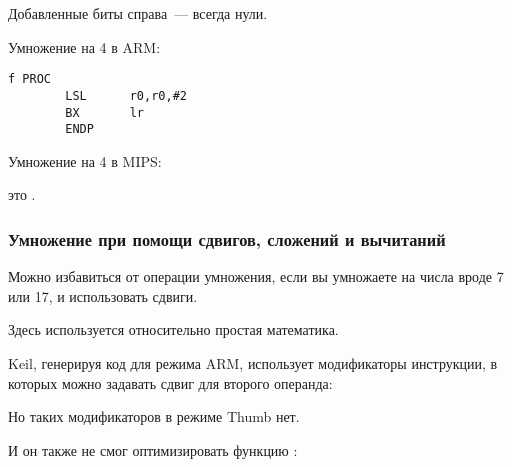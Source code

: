 Добавленные биты справа~--- всегда нули.

Умножение на 4 в ARM:

\begin{lstlisting}[caption=\NonOptimizingKeilVI (\ARMMode)]
f PROC
        LSL      r0,r0,#2
        BX       lr
        ENDP
\end{lstlisting}

Умножение на 4 в MIPS:



 это .

\subsubsection{Умножение при помощи сдвигов, сложений и вычитаний}
\label{multiplication_using_shifts_adds_subs}

Можно избавиться от операции умножения, если вы умножаете на числа вроде 7 или 17,
и использовать сдвиги.

Здесь используется относительно простая математика.








Keil, генерируя код для режима ARM, использует модификаторы инструкции, в которых можно задавать
сдвиг для второго операнда:



Но таких модификаторов в режиме Thumb нет.

И он также не смог оптимизировать функцию :






